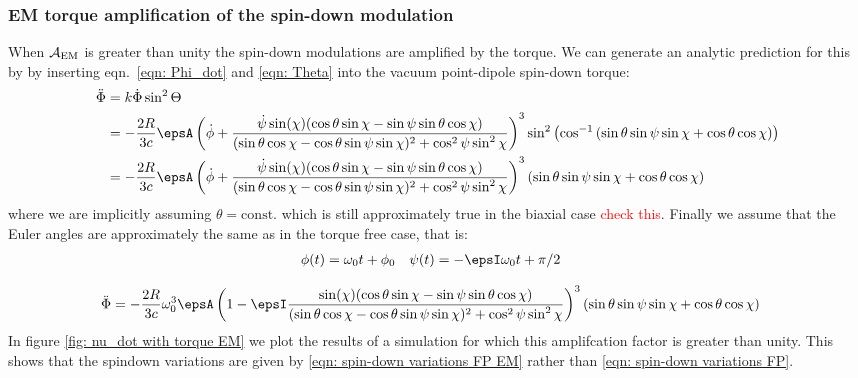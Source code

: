 \documentclass[/home/greg/Thesis/main/main.tex]{subfiles}
\begin{document}
\subsubsection{EM torque amplification of the spin-down modulation}
When $\mathcal{A}_{\mathrm{EM}}$ is greater than unity the spin-down modulations are amplified by 
the torque. We can generate an analytic prediction for this by by inserting
eqn.~\eqref{eqn: Phi_dot} and \eqref{eqn: Theta} into the vacuum point-dipole spin-down
torque:
\begin{align}
    \ddot{\Phi} & = k \dot{\Phi}\sin^{2}\Theta \\
                &=-\frac{2R}{3c} \epsA 
    \left(\dot{\phi} +  \frac{\dot{\psi} \sin(\chi)(\cos\theta\sin\chi - \sin \psi \sin \theta \cos\chi)
    }{(\sin\theta \cos \chi - \cos \theta \sin \psi \sin \chi)^{2} + \cos^{2}\psi \sin^{2} \chi}\right)^{3}
    \sin^{2}\left(\cos^{-1}\left(\sin\theta\sin\psi\sin\chi + \cos\theta\cos\chi\right)\right)\\
    &=-\frac{2R}{3c} \epsA 
    \left(\dot{\phi} +  \frac{\dot{\psi} \sin(\chi)(\cos\theta\sin\chi - \sin \psi \sin \theta \cos\chi)
    }{(\sin\theta \cos \chi - \cos \theta \sin \psi \sin \chi)^{2} + \cos^{2}\psi \sin^{2} \chi}\right)^{3}
    \left(\sin\theta\sin\psi\sin\chi + \cos\theta\cos\chi\right)
\end{align}
where we are implicitly assuming $\theta=\mathrm{const.}$ which is still 
approximately true in the biaxial case \textcolor{red}{check this}.
Finally we assume that the Euler angles are approximately the same as in 
the torque free case, that is:
\begin{align}
    \phi(t) = \omega_{0}t + \phi_{0} &&& \psi(t) = -\epsI \omega_{0} t + \pi/2
\end{align}

 \begin{align}
     \ddot{\Phi} &=-\frac{2R}{3c} \omega_{0}^{3}\epsA
     \left(1 -  \epsI\frac{ \sin(\chi)(\cos\theta\sin\chi - \sin \psi \sin \theta \cos\chi)
     }{(\sin\theta \cos \chi - \cos \theta \sin \psi \sin \chi)^{2} + \cos^{2}\psi \sin^{2} \chi}\right)^{3}
     \left(\sin\theta\sin\psi\sin\chi + \cos\theta\cos\chi\right)
 \end{align}     
In figure \ref{fig: nu_dot with torque EM} we plot the results of a simulation
for which this amplifcation factor is greater than unity. This shows that the
spindown variations are given by \ref{eqn: spin-down variations FP EM} rather
than \eqref{eqn: spin-down variations FP}.
\end{document}
